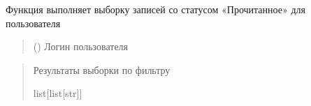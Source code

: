 \documentclass[letterpaper,10pt,russian]{sphinxmanual}
\begin{document}
\begin{fulllineitems}
\begin{description}
\begin{sphinxVerbatim}[commandchars=\\\{\}]
\end{sphinxVerbatim}

\end{description}

\begin{fulllineitems}
\label{\detokenize{database.sqlite3_interface.views:database.sqlite3_interface.views.view_end_read.ViewEndRead.select_for_user}}
\pysigstartsignatures
{}
\pysigstopsignatures
\sphinxAtStartPar
Функция выполняет выборку записей со статусом «Прочитанное» для пользователя
\begin{quote}\begin{description}
\sphinxAtStartPar
{} () \textendash{} Логин пользователя

\end{description}\end{quote}
\begin{description}
\begin{sphinxVerbatim}[commandchars=\\\{\}]
\end{sphinxVerbatim}

\end{description}
\begin{quote}\begin{description}
\sphinxAtStartPar
Результаты выборки по фильтру

\sphinxAtStartPar
list{[}list{[}str{]}{]}

\end{description}\end{quote}

\end{fulllineitems}


\end{fulllineitems}
\end{document}
